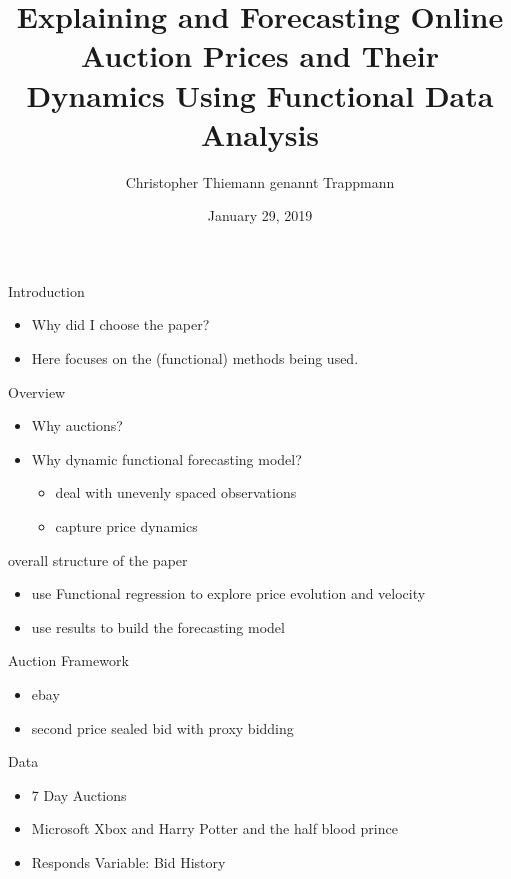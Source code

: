 \documentclass[hyperref={pdfpagelabels=false}]{beamer}
\title{Explaining and Forecasting Online Auction
Prices and Their Dynamics Using
Functional Data Analysis}
\author{Christopher Thiemann genannt Trappmann}
\date{January 29, 2019}
\begin{document}
\begin{frame}
\titlepage
\end{frame}





\begin{frame}{Introduction} %
\begin{itemize}
    \item Why did I choose the paper? %
    \item Here focuses on the (functional) methods being used.
\end{itemize}
\end{frame}

\begin{frame}{Overview}
\begin{itemize}
    \item Why auctions? %
    \item Why dynamic functional forecasting model?
    \begin{itemize}
        \item deal with unevenly spaced observations
        \item capture price dynamics
    \end{itemize}    
\end{itemize}
overall structure of the paper
\begin{itemize}
    \item use Functional regression to explore price evolution and velocity
    \item use results to build the forecasting model
\end{itemize}
\end{frame}

\begin{frame}{Auction Framework}
\begin{itemize}
    \item ebay
    \item second price sealed bid with proxy bidding
\end{itemize}
Data
\begin{itemize}
    \item 7 Day Auctions
    \item Microsoft Xbox and Harry Potter and the half blood prince
    \item Responds Variable: Bid History
\end{itemize}
\end{frame}
\end{document}
